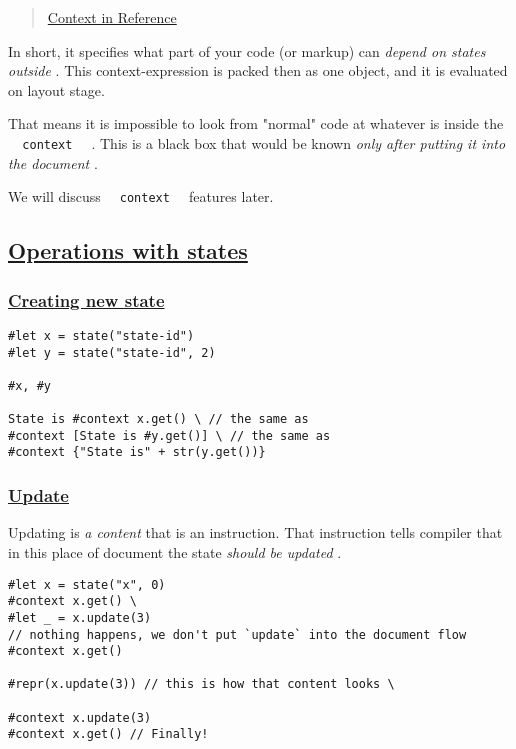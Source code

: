 \begin{quote}
\href{https://typst.app/docs/reference/context/}{Context in Reference}
\end{quote}

In short, it specifies what part of your code (or markup) can
\emph{depend on states outside} . This context-expression is packed then
as one object, and it is evaluated on layout stage.

That means it is impossible to look from "normal" code at whatever is
inside the \texttt{\ }{\texttt{\ context\ }}\texttt{\ } . This is a
black box that would be known \emph{only after putting it into the
document} .

We will discuss \texttt{\ }{\texttt{\ context\ }}\texttt{\ } features
later.

\subsection{\texorpdfstring{\hyperref[operations-with-states]{Operations
with states}}{Operations with states}}\label{operations-with-states}

\subsubsection{\texorpdfstring{\hyperref[creating-new-state]{Creating
new state}}{Creating new state}}\label{creating-new-state}

\begin{verbatim}
#let x = state("state-id")
#let y = state("state-id", 2)

#x, #y

State is #context x.get() \ // the same as
#context [State is #y.get()] \ // the same as
#context {"State is" + str(y.get())}
\end{verbatim}

\pandocbounded{}

\subsubsection{\texorpdfstring{\hyperref[update]{Update}}{Update}}\label{update}

Updating is \emph{a content} that is an instruction. That instruction
tells compiler that in this place of document the state \emph{should be
updated} .

\begin{verbatim}
#let x = state("x", 0)
#context x.get() \
#let _ = x.update(3)
// nothing happens, we don't put `update` into the document flow
#context x.get()

#repr(x.update(3)) // this is how that content looks \

#context x.update(3)
#context x.get() // Finally!
\end{verbatim}

